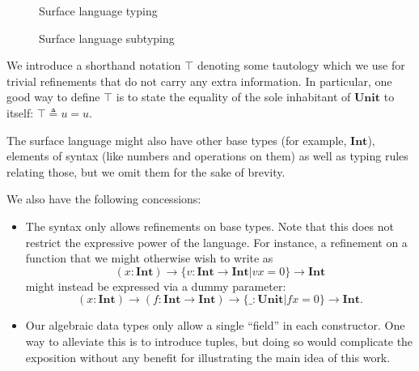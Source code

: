 \documentclass[a4paper]{article}
\newcommand{\unit}{u}
\newcommand{\Unit}{\textbf{Unit}}
\newcommand{\Int}{\textbf{Int}}
\begin{document}
\begin{figure}[ht]
  \footnotesize
  \caption{Surface language typing}
  \label{fig:surface_typing}
\end{figure}

\begin{figure}[ht]
  \footnotesize
  \caption{Surface language subtyping}
  \label{fig:surface_subtyping}
\end{figure}

We introduce a shorthand notation $\top$ denoting some tautology
which we use for trivial refinements that do not carry any extra information.
In particular, one good way to define $\top$ is
to state the equality of the sole inhabitant of $\Unit$ to itself:
$\top \triangleq \unit = \unit$.

The surface language might also have other base types (for example, $\Int$),
elements of syntax (like numbers and operations on them)
as well as typing rules relating those,
but we omit them for the sake of brevity.

We also have the following concessions:
\begin{itemize}
  \item The syntax only allows refinements on base types.
    Note that this does not restrict the expressive power of the language.
    For instance, a refinement on a function that we might otherwise wish to write as
    \[
      (x : \Int) \rightarrow \{ v : \Int \rightarrow \Int | v x = 0 \} \rightarrow \Int
    \]
    might instead be expressed via a dummy parameter:
    \[
      (x : \Int) \rightarrow (f : \Int \rightarrow \Int) \rightarrow \{ \_ : \Unit | f x = 0 \} \rightarrow \Int.
    \]
  \item Our algebraic data types only allow a single ``field'' in each constructor.
    One way to alleviate this is to introduce tuples,
    but doing so would complicate the exposition
    without any benefit for illustrating the main idea of this work.
\end{itemize}
\end{document}
